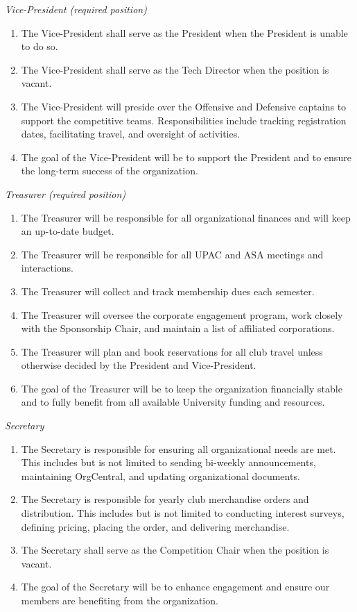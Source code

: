 \documentclass[12pt]{article}
\begin{document}
\textit{Vice-President (required position)}
\begin{enumerate}
  \item The Vice-President shall serve as the President when the President is unable to do so.
  \item The Vice-President shall serve as the Tech Director when the position is vacant.
  \item The Vice-President will preside over the Offensive and Defensive captains to support the competitive teams. Responsibilities include tracking registration dates, facilitating travel, and oversight of activities.
  \item The goal of the Vice-President will be to support the President and to ensure the long-term success of the organization.
\end{enumerate}

\textit{Treasurer (required position)}
\begin{enumerate}
  \item The Treasurer will be responsible for all organizational finances and will keep an up-to-date budget.
  \item The Treasurer will be responsible for all UPAC and ASA meetings and interactions.
  \item The Treasurer will collect and track membership dues each semester.
  \item The Treasurer will oversee the corporate engagement program, work closely with the Sponsorship Chair, and maintain a list of affiliated corporations.
  \item The Treasurer will plan and book reservations for all club travel unless otherwise decided by the President and Vice-President.
  \item The goal of the Treasurer will be to keep the organization financially stable and to fully benefit from all available University funding and resources.
\end{enumerate}

\textit{Secretary}
\begin{enumerate}
  \item The Secretary is responsible for ensuring all organizational needs are met. This includes but is not limited to sending bi-weekly announcements, maintaining OrgCentral, and updating organizational documents.
  \item The Secretary is responsible for yearly club merchandise orders and distribution. This includes but is not limited to conducting interest surveys, defining pricing, placing the order, and delivering merchandise.
  \item The Secretary shall serve as the Competition Chair when the position is vacant.
  \item The goal of the Secretary will be to enhance engagement and ensure our members are benefiting from the organization.
\end{enumerate}
\end{document}
